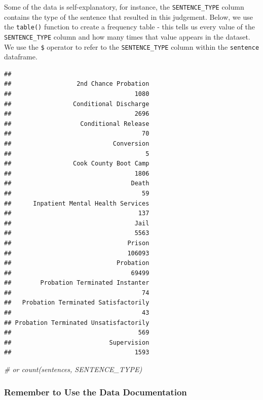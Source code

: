 \documentclass[]{article}
\newenvironment{Shaded}{\begin{snugshade}}{\end{snugshade}}
\newcommand{\KeywordTok}[1]{\textcolor[rgb]{0.13,0.29,0.53}{\textbf{#1}}}
\newcommand{\CommentTok}[1]{\textcolor[rgb]{0.56,0.35,0.01}{\textit{#1}}}
\newcommand{\OperatorTok}[1]{\textcolor[rgb]{0.81,0.36,0.00}{\textbf{#1}}}
\newcommand{\NormalTok}[1]{#1}
\begin{document}
\pagebreak

Some of the data is self-explanatory, for instance, the
\texttt{SENTENCE\_TYPE} column contains the type of the sentence that
resulted in this judgement. Below, we use the \texttt{table()} function
to create a frequency table - this tells us every value of the
\texttt{SENTENCE\_TYPE} column and how many times that value appears in
the dataset. We use the \texttt{\$} operator to refer to the
\texttt{SENTENCE\_TYPE} column within the \texttt{sentence} dataframe.

\begin{Shaded}
\end{Shaded}

\begin{verbatim}
## 
##                  2nd Chance Probation 
##                                  1080 
##                 Conditional Discharge 
##                                  2696 
##                   Conditional Release 
##                                    70 
##                            Conversion 
##                                     5 
##                 Cook County Boot Camp 
##                                  1806 
##                                 Death 
##                                    59 
##      Inpatient Mental Health Services 
##                                   137 
##                                  Jail 
##                                  5563 
##                                Prison 
##                                106093 
##                             Probation 
##                                 69499 
##        Probation Terminated Instanter 
##                                    74 
##   Probation Terminated Satisfactorily 
##                                    43 
## Probation Terminated Unsatisfactorily 
##                                   569 
##                           Supervision 
##                                  1593
\end{verbatim}

\begin{Shaded}
\begin{Highlighting}[]
\CommentTok{# or count(sentences, SENTENCE_TYPE)}
\end{Highlighting}
\end{Shaded}

\subsubsection{Remember to Use the Data
Documentation}\label{remember-to-use-the-data-documentation}
\end{document}
